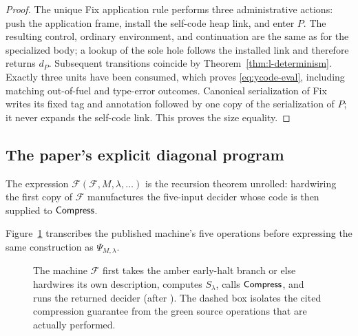 \begin{proof}
The unique Fix application rule performs three administrative actions: push
the application frame, install the self-code heap link, and enter \(P\).  The
resulting control, ordinary environment, and continuation are the same as for
the specialized body; a lookup of the sole hole follows the installed link and
therefore returns \(d_P\).  Subsequent transitions coincide by
Theorem~\ref{thm:l-determinism}.  Exactly three units have been consumed, which
proves \eqref{eq:ycode-eval}, including matching out-of-fuel and type-error
outcomes.  Canonical serialization of Fix writes its fixed tag and annotation
followed by one copy of the serialization of \(P\); it never expands the
self-code link.  This proves the size equality.
\end{proof}

\subsection{The paper's explicit diagonal program}

\begin{reminder}
The expression \(\mathcal F(\mathcal F,M,\lambda,\ldots)\) is the recursion theorem
unrolled: hardwiring the first copy of \(\mathcal F\) manufactures the
five-input decider whose code is then supplied to \(\mathsf{Compress}\).
\end{reminder}

Figure~\ref{fig:C-diagonal-five-steps} transcribes the published machine's five
operations before expressing the same construction as \(\Psi_{M,\lambda}\).
\begin{figure}[t]
\centering

\caption{The machine \(\mathcal F\) first takes the amber early-halt branch or else hardwires its own description, computes \(S_\lambda\), calls \(\mathsf{Compress}\), and runs the returned decider (after ).  The dashed box isolates the cited compression guarantee from the green source operations that are actually performed.}
\label{fig:C-diagonal-five-steps}
\end{figure}

